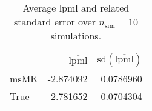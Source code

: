 \begin{table}[H]

\caption{Average lpml and related standard error over $n_{\text{sim}} = 10$ simulations.}
\centering
\begin{tabular}[t]{lrr}
\toprule
  & $\overbar{\text{lpml}}$ & $\text{sd}(\overbar{\text{lpml}})$\\
\midrule
msMK & -2.874092 & 0.0786960\\
True & -2.781652 & 0.0704304\\
\bottomrule
\end{tabular}
\end{table}